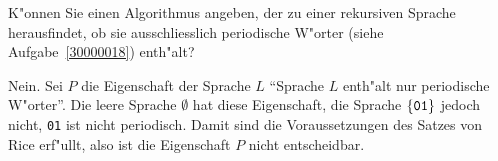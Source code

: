 K"onnen Sie einen Algorithmus angeben, der zu einer rekursiven
Sprache herausfindet, ob sie ausschliesslich periodische W"orter (siehe
Aufgabe~\ref{30000018})
enth"alt?

\begin{loesung}
Nein. Sei
$P$ die Eigenschaft der Sprache $L$ ``Sprache $L$ enth"alt
nur periodische W"orter''. Die leere Sprache $\emptyset$
hat diese Eigenschaft, die Sprache $\{{\tt 01}\}$ jedoch nicht,
{\tt 01} ist nicht periodisch.
Damit sind die Voraussetzungen des Satzes von Rice erf"ullt, also
ist die Eigenschaft $P$ nicht entscheidbar.
\end{loesung}
